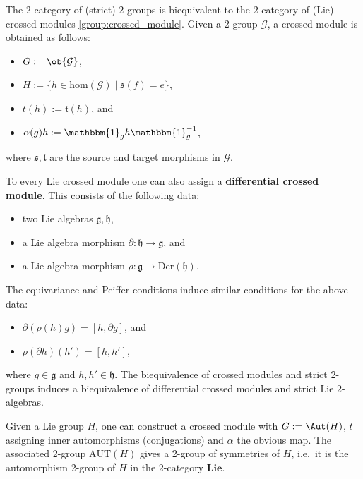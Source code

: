     \begin{property}
        The 2-category of (strict) 2-groups is biequivalent to the 2-category of (Lie) crossed modules \ref{group:crossed_module}. Given a 2-group $\mathcal{G}$, a crossed module is obtained as follows:
        \begin{itemize}
            \item $G:=\ob{\mathcal{G}}$,
            \item $H:=\{h\in\mathrm{hom}(\mathcal{G})\mid\mathfrak{s}(f)=e\}$,
            \item $t(h):=\mathfrak{t}(h)$, and
            \item $\alpha(g)h := \mathbbm{1}_gh\mathbbm{1}_g^{-1}$,
        \end{itemize}
        where $\mathfrak{s},\mathfrak{t}$ are the source and target morphisms in $\mathcal{G}$.

        To every Lie crossed module one can also assign a \textbf{differential crossed module}. This consists of the following data:
        \begin{itemize}
            \item two Lie algebras $\mathfrak{g},\mathfrak{h}$,
            \item a Lie algebra morphism $\partial:\mathfrak{h}\rightarrow\mathfrak{g}$, and
            \item a Lie algebra morphism $\rho:\mathfrak{g}\rightarrow\text{Der}(\mathfrak{h})$.
        \end{itemize}
        The equivariance and Peiffer conditions induce similar conditions for the above data:
        \begin{itemize}
            \item $\partial(\rho(h)g) = [h,\partial g]$, and
            \item $\rho(\partial h)(h') = [h,h']$,
        \end{itemize}
        where $g\in\mathfrak{g}$ and $h,h'\in\mathfrak{h}$. The biequivalence of crossed modules and strict 2-groups induces a biequivalence of differential crossed modules and strict Lie 2-algebras.
    \end{property}

    \begin{example}
        Given a Lie group $H$, one can construct a crossed module with $G:=\Aut(H)$, $t$ assigning inner automorphisms (conjugations) and $\alpha$ the obvious map. The associated 2-group $\mathrm{AUT}(H)$ gives a 2-group of symmetries of $H$, i.e.~it is the automorphism 2-group of $H$ in the 2-category $\mathbf{Lie}$.
    \end{example}

